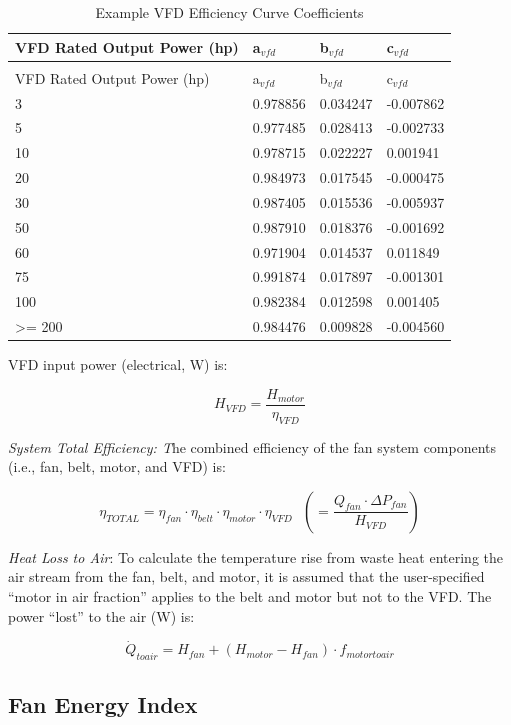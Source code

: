 \begin{longtable}[c]{@{}llll@{}}
\caption{Example VFD Efficiency Curve Coefficients \label{table:example-vfd-efficiency-curve-coefficients}} \tabularnewline
\toprule
VFD Rated Output Power (hp) & a\(_{vfd}\) & b\(_{vfd}\) & c\(_{vfd}\) \tabularnewline \midrule
\midrule
\endfirsthead

\caption[]{Example VFD Efficiency Curve Coefficients} \tabularnewline
\toprule
VFD Rated Output Power (hp) & a\(_{vfd}\) & b\(_{vfd}\) & c\(_{vfd}\) \tabularnewline \midrule
\midrule
\endhead

3 & 0.978856 & 0.034247 & -0.007862 \tabularnewline
5 & 0.977485 & 0.028413 & -0.002733 \tabularnewline
10 & 0.978715 & 0.022227 & 0.001941 \tabularnewline
20 & 0.984973 & 0.017545 & -0.000475 \tabularnewline
30 & 0.987405 & 0.015536 & -0.005937 \tabularnewline
50 & 0.987910 & 0.018376 & -0.001692 \tabularnewline
60 & 0.971904 & 0.014537 & 0.011849 \tabularnewline
75 & 0.991874 & 0.017897 & -0.001301 \tabularnewline
100 & 0.982384 & 0.012598 & 0.001405 \tabularnewline
>= 200 & 0.984476 & 0.009828 & -0.004560 \tabularnewline
\bottomrule
\end{longtable}

VFD input power (electrical, W) is:

\begin{equation}
{H_{VFD}} = \frac{{{H_{motor}}}}{{{\eta_{VFD}}}}
\end{equation}

\emph{System Total Efficiency: T}he combined efficiency of the fan system components (i.e., fan, belt, motor, and VFD) is:

\begin{equation}
{\eta_{TOTAL}} = {\eta_{fan}} \cdot {\eta_{belt}} \cdot {\eta_{motor}} \cdot {\eta_{VFD}} ~~~ \left( { = \frac{{{Q_{fan}} \cdot \Delta {P_{fan}}}}{{{H_{VFD}}}}} \right)
\end{equation}

\emph{Heat Loss to Air}: To calculate the temperature rise from waste heat entering the air stream from the fan, belt, and motor, it is assumed that the user-specified ``motor in air fraction'' applies to the belt and motor but not to the VFD. The power ``lost'' to the air (W) is:

\begin{equation}
{\dot Q_{toair}} = {H_{fan}} + \left( {{H_{motor}} - {H_{fan}}} \right) \cdot {f_{motortoair}}
\end{equation}

\subsection{Fan Energy Index}\label{fan-energy-index}

